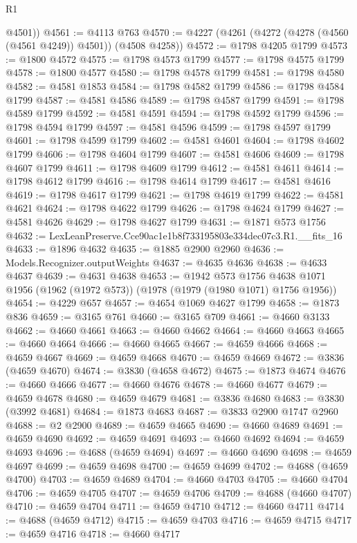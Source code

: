 \begin{lexlean}{R1}
\begin{coremodule}
        @4501))
@4561 := @4113 @763
@4570 := @4227 (@4261 (@4272 (@4278 (@4560 (@4561 @4249)) @4501)) (@4508 @4258))
@4572 := @1798 @4205 @1799
@4573 := @1800 @4572
@4575 := @1798 @4573 @1799
@4577 := @1798 @4575 @1799
@4578 := @1800 @4577
@4580 := @1798 @4578 @1799
@4581 := @1798 @4580
@4582 := @4581 @1853
@4584 := @1798 @4582 @1799
@4586 := @1798 @4584 @1799
@4587 := @4581 @4586
@4589 := @1798 @4587 @1799
@4591 := @1798 @4589 @1799
@4592 := @4581 @4591
@4594 := @1798 @4592 @1799
@4596 := @1798 @4594 @1799
@4597 := @4581 @4596
@4599 := @1798 @4597 @1799
@4601 := @1798 @4599 @1799
@4602 := @4581 @4601
@4604 := @1798 @4602 @1799
@4606 := @1798 @4604 @1799
@4607 := @4581 @4606
@4609 := @1798 @4607 @1799
@4611 := @1798 @4609 @1799
@4612 := @4581 @4611
@4614 := @1798 @4612 @1799
@4616 := @1798 @4614 @1799
@4617 := @4581 @4616
@4619 := @1798 @4617 @1799
@4621 := @1798 @4619 @1799
@4622 := @4581 @4621
@4624 := @1798 @4622 @1799
@4626 := @1798 @4624 @1799
@4627 := @4581 @4626
@4629 := @1798 @4627 @1799
@4631 := @1871 @573 @1756
@4632 := LexLeanPreserve.Cce90ac1e1b8f733195803e334dec07c3.R1.__fits_16
@4633 := @1896 @4632
@4635 := @1885 @2900 @2960
@4636 := Models.Recognizer.outputWeights
@4637 := @4635 @4636
@4638 := @4633 @4637
@4639 := @4631 @4638
@4653 := @1942
    @573
    @1756
    @4638
    @1071
    @1956
    (@1962 (@1972 @573))
    (@1978 (@1979 (@1980 @1071) @1756 @1956))
@4654 := @4229 @657
@4657 := @4654 @1069 @4627 @1799
@4658 := @1873 @836
@4659 := @3165 @761
@4660 := @3165 @709
@4661 := @4660 @3133
@4662 := @4660 @4661
@4663 := @4660 @4662
@4664 := @4660 @4663
@4665 := @4660 @4664
@4666 := @4660 @4665
@4667 := @4659 @4666
@4668 := @4659 @4667
@4669 := @4659 @4668
@4670 := @4659 @4669
@4672 := @3836 (@4659 @4670)
@4674 := @3830 (@4658 @4672)
@4675 := @1873 @4674
@4676 := @4660 @4666
@4677 := @4660 @4676
@4678 := @4660 @4677
@4679 := @4659 @4678
@4680 := @4659 @4679
@4681 := @3836 @4680
@4683 := @3830 (@3992 @4681)
@4684 := @1873 @4683
@4687 := @3833 @2900 @1747 @2960
@4688 := @2 @2900
@4689 := @4659 @4665
@4690 := @4660 @4689
@4691 := @4659 @4690
@4692 := @4659 @4691
@4693 := @4660 @4692
@4694 := @4659 @4693
@4696 := @4688 (@4659 @4694)
@4697 := @4660 @4690
@4698 := @4659 @4697
@4699 := @4659 @4698
@4700 := @4659 @4699
@4702 := @4688 (@4659 @4700)
@4703 := @4659 @4689
@4704 := @4660 @4703
@4705 := @4660 @4704
@4706 := @4659 @4705
@4707 := @4659 @4706
@4709 := @4688 (@4660 @4707)
@4710 := @4659 @4704
@4711 := @4659 @4710
@4712 := @4660 @4711
@4714 := @4688 (@4659 @4712)
@4715 := @4659 @4703
@4716 := @4659 @4715
@4717 := @4659 @4716
@4718 := @4660 @4717

\end{coremodule}
\end{lexlean}
